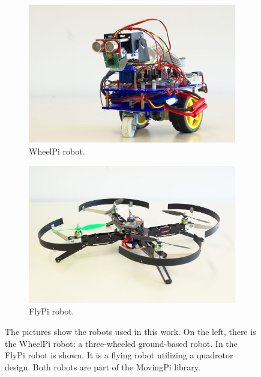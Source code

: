 \begin{figure}
  \centering
  \begin{subfigure}[]{0.475\textwidth}
    \includegraphics[width=1.0\textwidth]{./figures/robot/photos/wheelpi.jpg}
    \caption{WheelPi robot.}
    \label{fig:robot_introduction_photo_wheelpi}
  \end{subfigure}
  \hfill
  \begin{subfigure}[]{0.475\textwidth}
    \includegraphics[width=1.0\textwidth]{./figures/robot/photos/quadcopter.jpg}
    \caption{FlyPi robot.}
    \label{fig:robot_introduction_photo_flypi}
  \end{subfigure}
  \caption{The pictures show the robots used in this work. On the left, there is the WheelPi robot: a three-wheeled ground-based robot. In  the FlyPi robot is shown. It is a flying robot utilizing a quadrotor design. Both robots are part of the MovingPi library.}
  \label{fig:robot_introduction_photo}
\end{figure}

